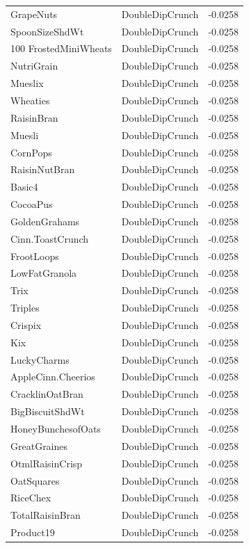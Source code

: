 \begin{longtable}{llr}
GrapeNuts & DoubleDipCrunch & -0.0258 \\
SpoonSizeShdWt & DoubleDipCrunch & -0.0258 \\
100%
FrostedMiniWheats & DoubleDipCrunch & -0.0258 \\
NutriGrain & DoubleDipCrunch & -0.0258 \\
Mueslix & DoubleDipCrunch & -0.0258 \\
Wheaties & DoubleDipCrunch & -0.0258 \\
RaisinBran & DoubleDipCrunch & -0.0258 \\
Muesli & DoubleDipCrunch & -0.0258 \\
CornPops & DoubleDipCrunch & -0.0258 \\
RaisinNutBran & DoubleDipCrunch & -0.0258 \\
Basic4 & DoubleDipCrunch & -0.0258 \\
CocoaPus & DoubleDipCrunch & -0.0258 \\
GoldenGrahams & DoubleDipCrunch & -0.0258 \\
Cinn.ToastCrunch & DoubleDipCrunch & -0.0258 \\
FrootLoops & DoubleDipCrunch & -0.0258 \\
LowFatGranola & DoubleDipCrunch & -0.0258 \\
Trix & DoubleDipCrunch & -0.0258 \\
Triples & DoubleDipCrunch & -0.0258 \\
Crispix & DoubleDipCrunch & -0.0258 \\
Kix & DoubleDipCrunch & -0.0258 \\
LuckyCharms & DoubleDipCrunch & -0.0258 \\
AppleCinn.Cheerios & DoubleDipCrunch & -0.0258 \\
CracklinOatBran & DoubleDipCrunch & -0.0258 \\
BigBiscuitShdWt & DoubleDipCrunch & -0.0258 \\
HoneyBunchesofOats & DoubleDipCrunch & -0.0258 \\
GreatGraines & DoubleDipCrunch & -0.0258 \\
OtmlRaisinCrisp & DoubleDipCrunch & -0.0258 \\
OatSquares & DoubleDipCrunch & -0.0258 \\
RiceChex & DoubleDipCrunch & -0.0258 \\
TotalRaisinBran & DoubleDipCrunch & -0.0258 \\
Product19 & DoubleDipCrunch & -0.0258 \\

\end{longtable}
